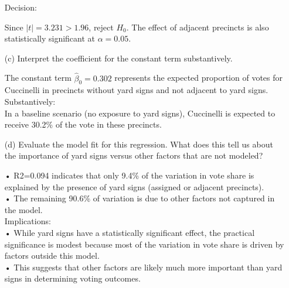 \documentclass[12pt,letterpaper]{article}
\begin{document}
\begin{enumerate}
	Decision:
	
	Since $|t|=3.231>1.96$, reject $H_0$. The effect of adjacent precincts is also statistically significant at $\alpha = 0.05$.
	\vspace{7cm}
	\item [(c)] Interpret the coefficient for the constant term substantively.
	
	The constant term $ \hat{\beta}_0 = 0.302$ represents the expected proportion of votes for Cuccinelli in precincts without yard signs and not adjacent to yard signs.\\
	
	Substantively:\\
	In a baseline scenario (no exposure to yard signs), Cuccinelli is expected to receive 30.2\% of the vote in these precincts.
	
	\vspace{7cm}
	
	\item [(d)] Evaluate the model fit for this regression.  What does this	tell us about the importance of yard signs versus other factors that are not modeled?
	
	•	R2=0.094 indicates that only 9.4\% of the variation in vote share is explained by the presence of yard signs (assigned or adjacent precincts).\\
	
	•	The remaining 90.6\% of variation is due to other factors not captured in the model.\\
	
	Implications:\\
	
	•	While yard signs have a statistically significant effect, the practical significance is modest because most of the variation in vote share is driven by factors outside this model.\\
	
	•	This suggests that other factors are likely much more important than yard signs in determining voting outcomes.
	
	
\end{enumerate}  
\end{document}
